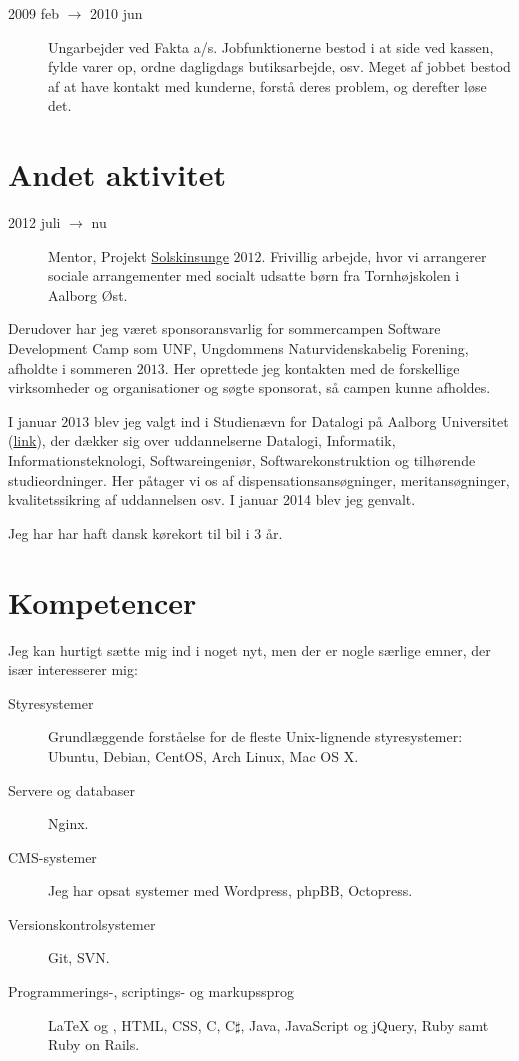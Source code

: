 \documentclass[margin,line,a4paper]{resume}
\begin{document}
\begin{resume}
\begin{description}
  \item[2009 feb $\rightarrow$ 2010 jun] Ungarbejder ved Fakta
    a/s. Jobfunktionerne bestod i at side ved kassen, fylde varer op,
    ordne dagligdags butiksarbejde, osv. Meget af jobbet bestod af at have
    kontakt med kunderne, forstå deres problem, og derefter løse det.
\end{description}

\section{\mysidestyle Andet aktivitet}\vspace{1mm}
\begin{description}
  \item[2012 juli $\rightarrow$ nu] Mentor, Projekt
    \href{http://www.urk.dk/solskinsunge/}{Solskinsunge} $2012$. Frivillig
    arbejde, hvor vi arrangerer sociale arrangementer med socialt udsatte
    børn fra Tornhøjskolen i Aalborg Øst.
\end{description}
Derudover har jeg været sponsoransvarlig for sommercampen Software
Development Camp som UNF, Ungdommens Naturvidenskabelig Forening,
afholdte i sommeren $2013$. Her oprettede jeg kontakten med de
forskellige virksomheder og organisationer og søgte sponsorat, så campen
kunne afholdes.

I januar $2013$ blev jeg valgt ind i
Studienævn for Datalogi på Aalborg Universitet
(\href{http://www.sict.aau.dk/studienaevn-for-datalogi/}{link}),
der dækker sig over uddannelserne Datalogi, Informatik,
Informationsteknologi, Softwareingeniør, Softwarekonstruktion
og tilhørende studieordninger. Her påtager vi os af
dispensationsansøgninger, meritansøgninger, kvalitetssikring af
uddannelsen osv. I januar 2014 blev jeg genvalt.

Jeg har har haft dansk kørekort til bil i $3$ år.

\section{\mysidestyle Kompetencer} \vspace{1mm}
Jeg kan hurtigt sætte mig ind i noget nyt, men der er nogle særlige
emner, der især interesserer mig:
\vspace{0.5cm}
\begin{description}
  \item[Styresystemer] Grundlæggende forståelse for de fleste
    Unix-lignende styresystemer: Ubuntu, Debian, CentOS, Arch Linux, Mac OS
    X.
  \item[Servere og databaser] Nginx. 
  \item[CMS-systemer] Jeg har opsat systemer med Wordpress, phpBB,
    Octopress.
  \item[Versionskontrolsystemer] Git, SVN.
  \item[Programmerings-, scriptings- og markupssprog] \LaTeX{} og
  \XeTeX{}, HTML, CSS, C, C$\sharp$, Java, JavaScript og jQuery, Ruby samt Ruby
  on Rails.
\end{description}


\end{resume}
\end{document}
